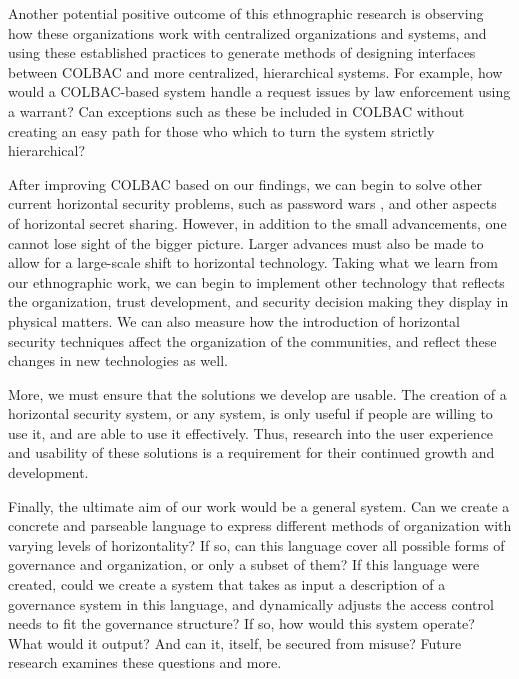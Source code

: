 Another potential positive outcome of this ethnographic research is observing
how these organizations work with centralized organizations and systems, and
using these established practices to generate methods of designing interfaces
between COLBAC and more centralized, hierarchical systems. For example, how
would a COLBAC-based system handle a request issues by law enforcement using a
warrant? Can exceptions such as these be included in COLBAC without creating an
easy path for those who which to turn the system strictly hierarchical?

After improving COLBAC based on our findings, we can begin to solve other
current horizontal security problems, such as password wars
\cite{kavada2020counterpublics}, and other aspects of horizontal secret sharing.
However, in addition to the small advancements, one cannot lose sight of the
bigger picture. Larger advances must also be made to allow for a large-scale
shift to horizontal technology. Taking what we learn from our ethnographic work,
we can begin to implement other technology that reflects the organization, trust
development, and security decision making they display in physical matters. We
can also measure how the introduction of horizontal security techniques affect
the organization of the communities, and reflect these changes in new
technologies as well.

More, we must ensure that the solutions we develop are usable. The creation of
a horizontal security system, or any system,  is only useful if people are
willing to use it, and are able to use it effectively. Thus, research into the
user experience and usability of these solutions is a requirement for their
continued growth and development.

Finally, the ultimate aim of our work would be a general system. Can we create a
concrete and parseable language to express different methods of organization
with varying levels of horizontality? If so, can this language cover all
possible forms of governance and organization, or only a subset of them? If this
language were created, could we create a system that takes as input a
description of a governance system in this language, and dynamically adjusts the
access control needs to fit the governance structure? If so, how would this
system operate? What would it output? And can it, itself, be secured from
misuse? Future research examines these questions and more.
